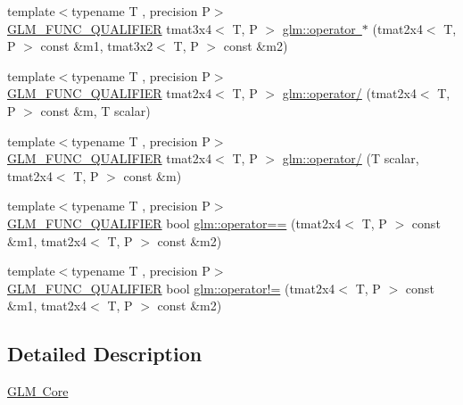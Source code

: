 \begin{DoxyCompactItemize}
\item 
{\footnotesize template$<$typename T , precision P$>$ }\\\mbox{\hyperlink{setup_8hpp_a33fdea6f91c5f834105f7415e2a64407}{G\+L\+M\+\_\+\+F\+U\+N\+C\+\_\+\+Q\+U\+A\+L\+I\+F\+I\+ER}} tmat3x4$<$ T, P $>$ \mbox{\hyperlink{namespaceglm_adc8e90fbed7f6ec3723d5dac617cb258}{glm\+::operator $\ast$}} (tmat2x4$<$ T, P $>$ const \&m1, tmat3x2$<$ T, P $>$ const \&m2)
\item 
{\footnotesize template$<$typename T , precision P$>$ }\\\mbox{\hyperlink{setup_8hpp_a33fdea6f91c5f834105f7415e2a64407}{G\+L\+M\+\_\+\+F\+U\+N\+C\+\_\+\+Q\+U\+A\+L\+I\+F\+I\+ER}} tmat2x4$<$ T, P $>$ \mbox{\hyperlink{namespaceglm_a92780a43038bd1a664552a3886e0f353}{glm\+::operator/}} (tmat2x4$<$ T, P $>$ const \&m, T scalar)
\item 
{\footnotesize template$<$typename T , precision P$>$ }\\\mbox{\hyperlink{setup_8hpp_a33fdea6f91c5f834105f7415e2a64407}{G\+L\+M\+\_\+\+F\+U\+N\+C\+\_\+\+Q\+U\+A\+L\+I\+F\+I\+ER}} tmat2x4$<$ T, P $>$ \mbox{\hyperlink{namespaceglm_a47d50cf64981755097cb147a1742a257}{glm\+::operator/}} (T scalar, tmat2x4$<$ T, P $>$ const \&m)
\item 
{\footnotesize template$<$typename T , precision P$>$ }\\\mbox{\hyperlink{setup_8hpp_a33fdea6f91c5f834105f7415e2a64407}{G\+L\+M\+\_\+\+F\+U\+N\+C\+\_\+\+Q\+U\+A\+L\+I\+F\+I\+ER}} bool \mbox{\hyperlink{namespaceglm_acf9efbc338894088f7ca5419c6a0cf81}{glm\+::operator==}} (tmat2x4$<$ T, P $>$ const \&m1, tmat2x4$<$ T, P $>$ const \&m2)
\item 
{\footnotesize template$<$typename T , precision P$>$ }\\\mbox{\hyperlink{setup_8hpp_a33fdea6f91c5f834105f7415e2a64407}{G\+L\+M\+\_\+\+F\+U\+N\+C\+\_\+\+Q\+U\+A\+L\+I\+F\+I\+ER}} bool \mbox{\hyperlink{namespaceglm_a979ffc34e33d3dd7ca8375b30c021384}{glm\+::operator!=}} (tmat2x4$<$ T, P $>$ const \&m1, tmat2x4$<$ T, P $>$ const \&m2)
\end{DoxyCompactItemize}


\subsection{Detailed Description}
\mbox{\hyperlink{group__core}{G\+LM Core}} 